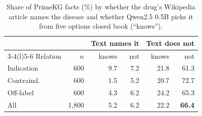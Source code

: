 \begin{table}[t]
\centering
\small
\setlength{\tabcolsep}{4pt}
\begin{tabular}{@{}lrrrrr@{}}
\toprule
 & & \multicolumn{2}{c}{Text names it} & \multicolumn{2}{c}{Text does not} \\
\cmidrule(lr){3-4}\cmidrule(l){5-6}
Relation & $n$ & knows & not & knows & not \\
\midrule
Indication & 600 & 9.7 & 7.2 & 21.8 & 61.3 \\
Contraind. & 600 & 1.5 & 5.2 & 20.7 & 72.7 \\
Off-label & 600 & 4.3 & 6.2 & 24.2 & 65.3 \\
\midrule
All & 1,800 & 5.2 & 6.2 & 22.2 & \textbf{66.4} \\
\bottomrule
\end{tabular}
\caption{Share of PrimeKG facts (\%) by whether the drug's Wikipedia article
names the disease and whether Qwen2.5 0.5B picks it from five options closed
book (``knows'').}
\label{tab:boxes}
\end{table}
